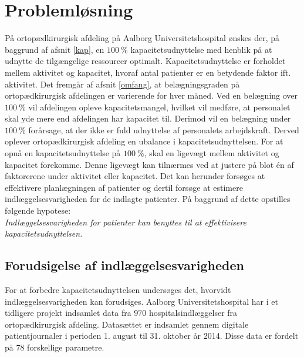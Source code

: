 \chapter{Problemløsning}
På ortopædkirurgisk afdeling på Aalborg Universitetshospital ønskes der, på baggrund af afsnit \ref{kap}, en $100~\%$ kapacitetsudnyttelse med henblik på at udnytte de tilgængelige ressourcer optimalt. Kapacitetsudnyttelse er forholdet mellem aktivitet og kapacitet, hvoraf antal patienter er en betydende faktor ift. aktivitet. 
Det fremgår af afsnit \ref{omfang}, at belægningsgraden på ortopædkirurgisk afdelingen er varierende for hver måned. Ved en belægning over $100~\%$ vil afdelingen opleve kapacitetsmangel, hvilket vil medføre, at personalet skal yde mere end afdelingen har kapacitet til. Derimod vil en belægning under $100~\%$ forårsage, at der ikke er fuld udnyttelse af personalets arbejdskraft. Derved oplever ortopædkirurgisk afdeling en ubalance i kapacitetsudnyttelsen. 
For at opnå en kapacitetsudnyttelse på $100~\%$, skal en ligevægt mellem aktivitet og kapacitet forekomme. Denne ligevægt kan tilnærmes ved at justere på blot én af faktorerene under aktivitet eller kapacitet\cite{Bames2015}. Det kan herunder forsøges at effektivere planlægningen af patienter og dertil forsøge at estimere indlæggelsesvarigheden for de indlagte patienter. 
På baggrund af dette opstilles følgende hypotese:\\

\noindent
\textit{Indlæggelsesvarigheden for patienter kan benyttes til at effektivisere kapacitetsudnyttelsen.} 

\section{Forudsigelse af indlæggelsesvarigheden}
For at forbedre kapacitetsudnyttelsen undersøges det, hvorvidt indlæggelsesvarigheden kan forudsiges.
Aalborg Universitetshospital har i et tidligere projekt indsamlet data fra $970$ hospitalsindlæggelser fra ortopædkirurgisk afdeling. Datasættet er indsamlet gennem digitale patientjournaler i perioden 1. august til 31. oktober år 2014. Disse data er fordelt på 78 forskellige parametre. %

